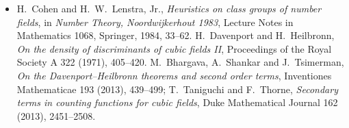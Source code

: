 \begin{itemize}
{roots}, Quarterly Journal of Mathematics 37 (1986), 27--38.
\item H.~Cohen and H.~W.~Lenstra, Jr., \emph{Heuristics on class groups of number fields}, in \emph{Number Theory, Noordwijkerhout 1983}, Lecture Notes in
Mathematics 1068, Springer, 1984, 33--62. H.~Davenport and H.~Heilbronn, \emph{On the density of discriminants of cubic fields II}, Proceedings of the Royal
Society A 322 (1971), 405--420. M.~Bhargava, A.~Shankar and J.~Tsimerman, \emph{On the Davenport--Heilbronn theorems and second order terms}, Inventiones
Mathematicae 193 (2013), 439--499; T.~Taniguchi and F.~Thorne, \emph{Secondary terms in counting functions for cubic fields}, Duke Mathematical Journal 162
(2013), 2451--2508.
\end{itemize}
